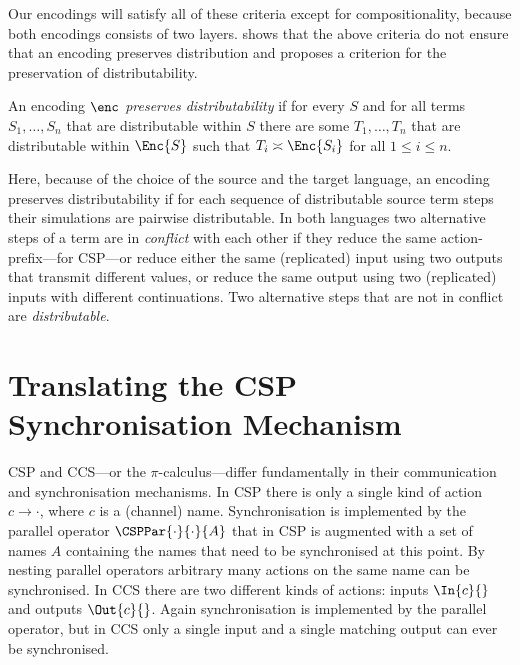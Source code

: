 \documentclass[]{eptcs}
\begin{document}
Our encodings will satisfy all of these criteria except for compositionality, because both encodings consists of two layers.
\cite{petersNestmannGoltz13} shows that the above criteria do not ensure that an encoding preserves distribution and proposes a criterion for the preservation of distributability.

\begin{definition}
	\label{def:distributabilityPreservation}

	An encoding $ \enc $ \emph{preserves distributability} if for every $ S $ and for all terms $ S_1, \ldots, S_n $ that are distributable within $ S $ there are some $ T_1, \ldots, T_n $ that are distributable within $ \Enc{S} $ such that $ T_i \asymp \Enc{S_i} $ for all $ 1 \leq i \leq n $.
\end{definition}

\noindent
Here, because of the choice of the source and the target language, an encoding preserves distributability if for each sequence of distributable source term steps their simulations are pairwise distributable. In both languages two alternative steps of a term are in \emph{conflict} with each other if they reduce the same action-prefix---for CSP---or reduce either the same (replicated) input using two outputs that transmit different values, or reduce the same output using two (replicated) inputs with different continuations. Two alternative steps that are not in conflict are \emph{distributable}.

\section{Translating the CSP Synchronisation Mechanism}
\label{sec:innerPart}

CSP and CCS---or the $ \pi $-calculus---differ fundamentally in their communication and synchronisation mechanisms.
In CSP there is only a single kind of action $ c \rightarrow \cdot $, where $ c $ is a (channel) name. Synchronisation is implemented by the parallel operator $ \CSPPar{\cdot}{\cdot}{A} $ that in CSP is augmented with a set of names $ A $ containing the names that need to be synchronised at this point. By nesting parallel operators arbitrary many actions on the same name can be synchronised.
In CCS there are two different kinds of actions: inputs $ \In{c}{} $ and outputs $ \Out{c}{} $. Again synchronisation is implemented by the parallel operator, but in CCS only a single input and a single matching output can ever be synchronised.
\end{document}
